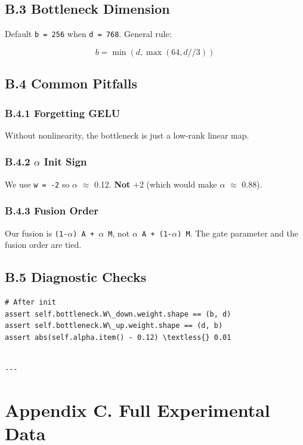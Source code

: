 \subsection{B.3 Bottleneck Dimension}

Default \texttt{b = 256} when \texttt{d = 768}. General rule:

\[
b = \min(d, \max(64, d // 3))
\tag{B.1}
\]

\subsection{B.4 Common Pitfalls}

\subsubsection{B.4.1 Forgetting GELU}

Without nonlinearity, the bottleneck is just a low-rank linear map.

\subsubsection{B.4.2 $\alpha$ Init Sign}

We use \texttt{w  = -2} so $\alpha$  $\approx$ 0.12. \textbf{Not} +2 (which would make $\alpha$ $\approx$ 0.88).

\subsubsection{B.4.3 Fusion Order}

Our fusion is \texttt{(1-$\alpha$) A + $\alpha$ M}, not \texttt{$\alpha$ A + (1-$\alpha$) M}. The gate parameter 
and the fusion order are tied.

\subsection{B.5 Diagnostic Checks}

\begin{lstlisting}
# After init
assert self.bottleneck.W\_down.weight.shape == (b, d)
assert self.bottleneck.W\_up.weight.shape == (d, b)
assert abs(self.alpha.item() - 0.12) \textless{} 0.01
\end{lstlisting}
\begin{lstlisting}

---
\end{lstlisting}

\section{Appendix C. Full Experimental Data}

